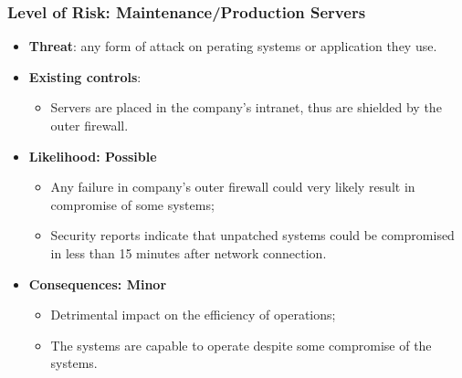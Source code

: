 \documentclass[xcolor ={table,usenames,dvipsnames}]{beamer}
\theoremstyle{definition}
\begin{document}
	\begin{frame}
		\frametitle{Level of Risk: Maintenance/Production Servers}
		\begin{itemize}
			\item \textbf{Threat}: any form of attack on perating systems or application they use.
			\item \textbf{Existing controls}: 
			\begin{itemize}
				\item Servers are placed in the company's intranet, thus are shielded by the outer firewall. 
			\end{itemize} 
			\item \textbf{Likelihood: Possible  }
			\begin{itemize}
				\item Any failure in company's outer firewall could very likely result in compromise of some systems;
				\item Security reports indicate that unpatched systems could be compromised in less than 15 minutes after network connection.  
			\end{itemize}	
			\item \textbf{Consequences: Minor }
			\begin{itemize}
				\item Detrimental impact on the efficiency of operations;
				\item The systems are capable to operate despite some compromise of the systems.
			\end{itemize}
		\end{itemize}
	\end{frame}
\end{document}
